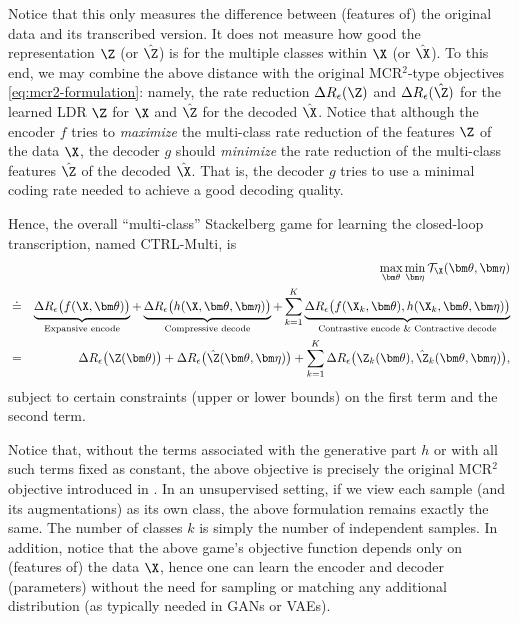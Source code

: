\documentclass[../../book-main.tex]{subfiles}
\begin{document}
Notice that this only measures the difference between (features of) the original data and its transcribed version. It does not measure how good the representation $\Z$ (or $\hat \Z$) is for the multiple classes within $\X$ (or $\hat \X$). To this end, we may combine the above distance with the original MCR$^2$-type objectives \eqref{eq:mcr2-formulation}: namely, the rate reduction $\Delta R_\epsilon(\Z)$ and $\Delta R_\epsilon(\hat \Z)$ for the learned LDR $\Z$ for $\X$ and $\hat \Z$ for the decoded $\hat \X$. Notice that although the encoder $f$ tries to {\em maximize} the multi-class rate reduction of the features $\Z$ of the data $\X$, the decoder $g$ should {\em minimize} the rate reduction of the multi-class features $\hat \Z$ of the decoded $\hat \X$. That is, the decoder $g$ tries to use a minimal coding rate needed to achieve a good decoding quality. 

Hence, the overall ``multi-class'' Stackelberg game for learning the closed-loop transcription, named CTRL-Multi, is
\begin{eqnarray}
&&\max_{\bm \theta} \min_{\bm \eta} \mathcal{T}_{\X}(\bm \theta, \bm \eta) \\
&\doteq& \underbrace{\Delta R_\epsilon\big(f(\X,\bm \theta)\big)}_{\text{Expansive encode}} + \underbrace{\Delta R_\epsilon\big(h(\X,\bm \theta, \bm \eta)\big)}_{\text{Compressive decode}} + \sum_{k=1}^K \underbrace{\Delta R_\epsilon\big(f(\X_k,\bm \theta), h(\X_k,\bm \theta,\bm \eta)\big)}_{\text{Contrastive encode \& Contractive decode}}   \\
&=& \Delta R_\epsilon\big(\Z(\bm \theta) \big) + \Delta R_\epsilon\big(\hat \Z(\bm \theta, \bm \eta)\big) + \sum_{k=1}^K \Delta R_\epsilon\big(\Z_k(
\bm \theta), \hat \Z_k(\bm \theta, \bm \eta) \big),
    \label{eq:MCR2-GAN-objective}
\end{eqnarray}
subject to certain constraints (upper or lower bounds) on the first term and the second term.



Notice that, without the terms associated with the generative part $h$ or with all such terms fixed as constant, the above objective is precisely the original MCR$^2$ objective introduced in . In an unsupervised setting, if we view each sample (and its augmentations) as its own class, the above formulation remains exactly the same. The number of classes $k$ is simply the number of independent samples. In addition, notice that the above game's objective function depends only on (features of) the data $\X$, hence one can learn the encoder and decoder (parameters) without the need for sampling or matching any additional distribution (as typically needed in GANs or VAEs).
\end{document}
